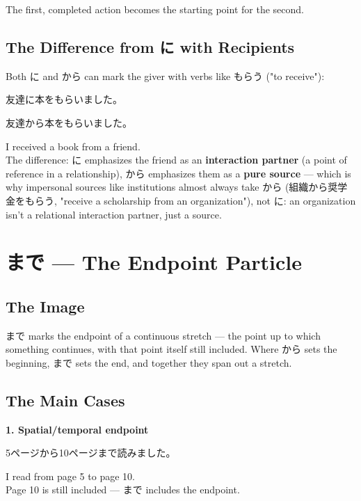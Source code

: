 \documentclass[12pt]{book}
\begin{document}
The first, completed action becomes the starting point for the second.

\section*{The Difference from に with Recipients}

Both に and から can mark the giver with verbs like もらう ("to receive"):

\par\quad 友達に本をもらいました。\\
\par\quad 友達から本をもらいました。\\
\par\quad I received a book from a friend.\\

The difference: に emphasizes the friend as an \textbf{interaction partner} (a point of reference in a relationship), から emphasizes them as a \textbf{pure source} — which is why impersonal sources like institutions almost always take から (組織から奨学金をもらう, "receive a scholarship from an organization"), not に: an organization isn't a relational interaction partner, just a source.


\chapter{まで — The Endpoint Particle}

\section*{The Image}

まで marks the endpoint of a continuous stretch — the point up to which something continues, with that point itself still included. Where から sets the beginning, まで sets the end, and together they span out a stretch.

\section*{The Main Cases}

\textbf{1. Spatial/temporal endpoint}
\par\quad 5ページから10ページまで読みました。\\
\par\quad I read from page 5 to page 10.\\

Page 10 is still included — まで includes the endpoint.
\end{document}
